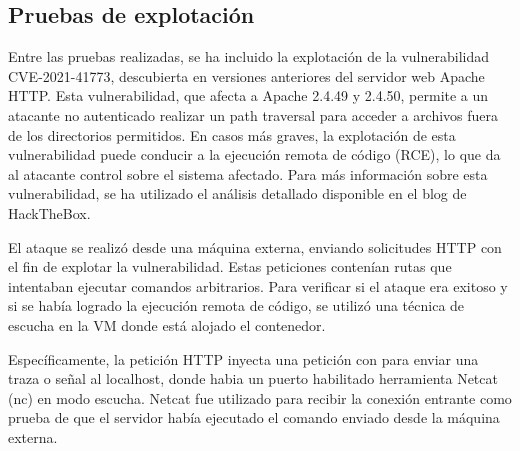 \subsection{Pruebas de explotación}
Entre las pruebas realizadas, se ha incluido la explotación de la vulnerabilidad CVE-2021-41773, descubierta en versiones anteriores del servidor web Apache HTTP. Esta vulnerabilidad, que afecta a Apache 2.4.49 y 2.4.50, permite a un atacante no autenticado realizar un path traversal para acceder a archivos fuera de los directorios permitidos. En casos más graves, la explotación de esta vulnerabilidad puede conducir a la ejecución remota de código (RCE), lo que da al atacante control sobre el sistema afectado. Para más información sobre esta vulnerabilidad, se ha utilizado el análisis detallado disponible en el blog de HackTheBox\cite{cve-2021-41773}.

El ataque se realizó desde una máquina externa, enviando solicitudes HTTP con el fin de explotar la vulnerabilidad. Estas peticiones contenían rutas que intentaban ejecutar comandos arbitrarios. Para verificar si el ataque era exitoso y si se había logrado la ejecución remota de código, se utilizó una técnica de escucha en la VM donde está alojado el contenedor.

Específicamente, la petición HTTP inyecta una petición con \cite{netcat} para enviar una traza o señal al localhost, donde habia un puerto habilitado herramienta Netcat (nc) en modo escucha. Netcat fue utilizado para recibir la conexión entrante como prueba de que el servidor había ejecutado el comando enviado desde la máquina externa.
